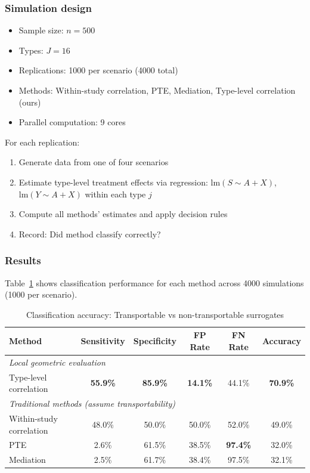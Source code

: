 \documentclass{article}
\begin{document}
\subsubsection{Simulation design}

\begin{itemize}
    \item Sample size: $n = 500$
    \item Types: $J = 16$
    \item Replications: 1000 per scenario (4000 total)
    \item Methods: Within-study correlation, PTE, Mediation, Type-level correlation (ours)
    \item Parallel computation: 9 cores
\end{itemize}

For each replication:
\begin{enumerate}
    \item Generate data from one of four scenarios
    \item Estimate type-level treatment effects via regression: $\text{lm}(S \sim A + X)$, $\text{lm}(Y \sim A + X)$ within each type $j$
    \item Compute all methods' estimates and apply decision rules
    \item Record: Did method classify correctly?
\end{enumerate}

\subsubsection{Results}

Table~\ref{tab:classification} shows classification performance for each method across 4000 simulations (1000 per scenario).

\begin{table}[h]
\centering
\caption{Classification accuracy: Transportable vs non-transportable surrogates}
\label{tab:classification}
\begin{tabular}{lccccc}
\toprule
Method & Sensitivity & Specificity & FP Rate & FN Rate & Accuracy \\
\midrule
\multicolumn{6}{l}{\textit{Local geometric evaluation}} \\
Type-level correlation & \textbf{55.9\%} & \textbf{85.9\%} & \textbf{14.1\%} & 44.1\% & \textbf{70.9\%} \\
\midrule
\multicolumn{6}{l}{\textit{Traditional methods (assume transportability)}} \\
Within-study correlation & 48.0\% & 50.0\% & 50.0\% & 52.0\% & 49.0\% \\
PTE & 2.6\% & 61.5\% & 38.5\% & \textbf{97.4\%} & 32.0\% \\
Mediation & 2.5\% & 61.7\% & 38.4\% & 97.5\% & 32.1\% \\
\bottomrule
\end{tabular}
\end{table}
\end{document}
